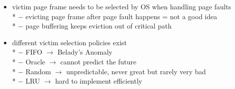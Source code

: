 \begin{summary}
  \begin{itemize}
    \item victim page frame needs to be selected by OS when handling page faults \\*
      $ - $ evicting page frame after page fault happens = not a good idea \\*
      $ - $ page buffering keeps eviction out of critical path
    \item different victim selection policies exist \\*
      $ - $ FIFO $ \to $ Belady's Anomaly \\*
      $ - $ Oracle $ \to $ cannot predict the future \\*
      $ - $ Random $ \to $ unpredictable, never great but rarely very bad \\*
      $ - $ LRU $ \to $ hard to implement efficiently
  \end{itemize}
\end{summary}